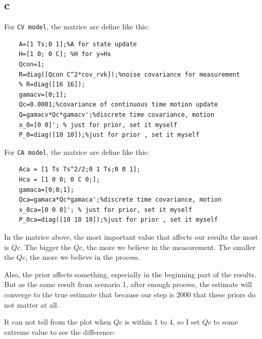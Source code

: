 \subsection{c}

For \texttt{CV model}, the matrice are define like this:

\begin{lstlisting}
    A=[1 Ts;0 1];%A for state update
    H=[1 0; 0 C]; %H for y=Hx
    Qcon=1;
    R=diag([Qcon C^2*cov_rvk]);%noise covariance for measurement
    % R=diag([16 16]);
    gamacv=[0;1];
    Qc=0.0001;%covariance of continuous time motion update
    Q=gamacv*Qc*gamacv';%discrete time covariance, motion
    x_0=[0 0]'; % just for prior, set it myself
    P_0=diag([10 10]);%just for prior , set it myself
\end{lstlisting}

For \texttt{CA model}, the matrice are define like this:

\begin{lstlisting}
    Aca = [1 Ts Ts^2/2;0 1 Ts;0 0 1];
    Hca = [1 0 0; 0 C 0;];
    gamaca=[0;0;1];
    Qca=gamaca*Qc*gamaca';%discrete time covariance, motion
    x_0ca=[0 0 0]'; % just for prior, set it myself
    P_0ca=diag([10 10 10]);%just for prior , set it myself
\end{lstlisting}

In the matrice above, the most important value that affects our results the most is $Qc$. The bigger the $Qc$, the more we believe in the measurement. The smaller the $Qc$, the more we believe in the process.

Also, the prior affects something, especially in the beginning part of the results. But as the same result from scenario 1, after enough process, the estimate will converge to the true estimate that because our step is 2000 that these priors do not matter at all.

It can not tell from the plot when $ Qc $ is within 1 to 4, so I set $ Qc $ to some extreme value to see the difference:

